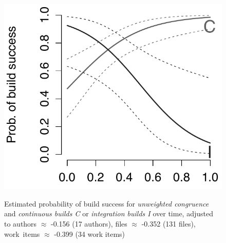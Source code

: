 \begin{figure}
{	\includegraphics[scale=0.372]{figures/prob_unweighted_age_typeci_q050}
     \label{subfig:prob_unweighted_age_typeci_q050}
  }
  
	\caption{Estimated probability of build success for \emph{unweighted congruence} and \emph{continuous builds C} or \emph{integration builds I}  over time, adjusted to authors $\approx$ -0.156 (17 authors), files $\approx$ -0.352 (131 files), work~items $\approx$ -0.399 (34 work items)}
	\label{fig:unweighted_congruence_typeci_age}
\end{figure}

